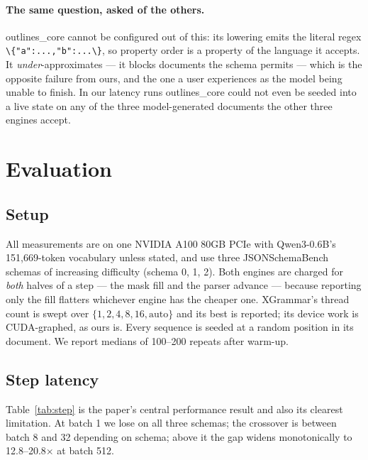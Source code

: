 \documentclass{article}
\begin{document}
\paragraph{The same question, asked of the others.} outlines\_core cannot be
configured out of this: its lowering emits the literal regex
\verb|\{"a":...,"b":...\}|, so property order is a property of the language it
accepts. It \emph{under}-approximates --- it blocks documents the schema
permits --- which is the opposite failure from ours, and the one a user
experiences as the model being unable to finish. In our latency runs
outlines\_core could not even be seeded into a live state on any of the three
model-generated documents the other three engines accept.

\section{Evaluation}
\label{sec:eval}

\subsection{Setup}

All measurements are on one NVIDIA A100 80GB PCIe with Qwen3-0.6B's
151{,}669-token vocabulary unless stated, and use three JSONSchemaBench schemas
of increasing difficulty (schema 0, 1, 2). Both engines are charged for
\emph{both} halves of a step --- the mask fill and the parser advance --- because
reporting only the fill flatters whichever engine has the cheaper one.
XGrammar's thread count is swept over $\{1,2,4,8,16,\text{auto}\}$ and its best
is reported; its device work is CUDA-graphed, as ours is. Every sequence is
seeded at a random position in its document. We report medians of 100--200
repeats after warm-up.

\subsection{Step latency}
\label{sec:eval-step}

Table~\ref{tab:step} is the paper's central performance result and also its
clearest limitation. At batch 1 we lose on all three schemas; the crossover is
between batch 8 and 32 depending on schema; above it the gap widens
monotonically to 12.8--20.8$\times$ at batch 512.
\end{document}
